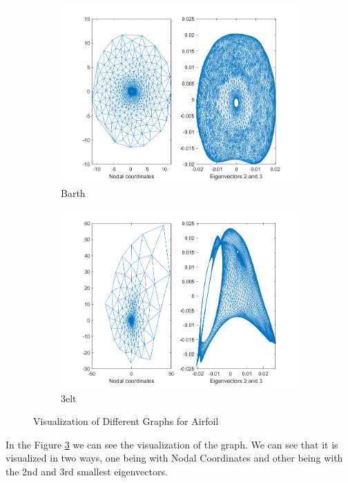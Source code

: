 \documentclass[unicode,11pt,a4paper,oneside,numbers=endperiod,openany]{scrartcl}
\begin{document}
\begin{figure}[H]
    \begin{subfigure}{0.45\textwidth}
        \centering
        \includegraphics[width=\linewidth]{figures/2.1_barth.png}
        \caption{Barth}
        \label{fig:barth}
    \end{subfigure}
    \hfill
    \begin{subfigure}{0.45\textwidth}
        \centering
        \includegraphics[width=\linewidth]{figures/2.1_3elt.png}
        \caption{3elt}
        \label{fig:3elt}
    \end{subfigure}
    \caption{Visualization of Different Graphs for Airfoil}
    \label{fig:overall3}
\end{figure}

In the Figure \ref{fig:overall3} we can see the visualization of the graph. We can see that it is visualized in two ways, one being with Nodal Coordinates and other being with the 2nd and 3rd smallest eigenvectors.
\end{document}
